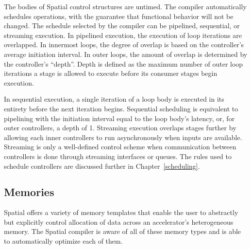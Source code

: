 The bodies of Spatial control structures are untimed. The compiler automatically schedules operations, with the guarantee that functional behavior will not be changed.
The schedule selected by the compiler can be pipelined, sequential, or streaming execution. In pipelined execution, the execution of loop iterations are overlapped.
In innermost loops, the degree of overlap is based on the controller's average initiation interval.
In outer loops, the amount of overlap is determined by the controller's ``depth''. Depth is defined as the maximum number of outer loop iterations a stage is allowed to execute before its consumer stages begin execution.

In sequential execution, a single iteration of a loop body is executed in its entirety before the next iteration begins.
Sequential scheduling is equivalent to pipelining with the initiation interval equal to the loop body's latency, or, for outer controllers, a depth of 1. Streaming execution overlaps stages further by allowing each inner controllers to run asynchronously when inputs are available.
Streaming is only a well-defined control scheme when communication between controllers is done through streaming interfaces or queues.
The rules used to schedule controllers are discussed further in Chapter~\ref{scheduling}.



\subsection{Memories}



Spatial offers a variety of memory templates that enable the user to abstractly but explicitly control allocation of data across an accelerator's heterogeneous memory.
The Spatial compiler is aware of all of these memory types and is able to automatically optimize each of them.

